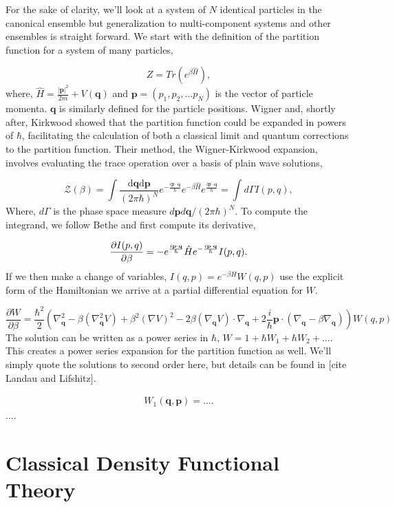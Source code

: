 For the sake of clarity, we'll look at a system of $N$ identical particles in the canonical ensemble but generalization to multi-component systems and other ensembles is straight forward. 
We start with the definition of the partition function for a system of many particles,  

\begin{equation}
    Z = Tr(e^{\beta \hat{H}}),
\end{equation} 
where, $\hat{H} = \frac{\vert\mathbf{p}\vert^2}{2m} + V(\mathbf{q})$ and $\mathbf{p} = (p_1, p_2, ...p_N)$ is the vector of particle momenta. 
$\mathbf{q}$ is similarly defined for the particle positions.
Wigner and, shortly after, Kirkwood showed that the partition function could be expanded in powers of $\hbar$, facilitating the calculation of both a classical limit and quantum corrections to the partition function.
Their method, the Wigner-Kirkwood expansion, involves evaluating the trace operation over a basis of plain wave solutions,

\begin{equation}
	\mathcal{Z}(\beta) = \int 
		\frac{\mathrm{d}\mathbf{q} \mathrm{d}\mathbf{p}}{(2\pi \hbar)^N}
		e^{-\frac{i\mathbf{p}\cdot\mathbf{q}}{\hbar}}
		e^{-\beta \hat{H}}
		e^{\frac{i\mathbf{p}\cdot\mathbf{q}}{\hbar}} = \int d\Gamma I(p, q),
\end{equation}
Where, $d\Gamma$ is the phase space measure $d\mathbf{p}d\mathbf{q}/(2\pi\hbar)^N$. To compute the integrand, we follow Bethe and first compute its derivative,

\begin{equation}
	\frac{\partial I(p, q)}{\partial \beta} = -e^{\frac{i\mathbf{p}\cdot\mathbf{q}}{\hbar}}\hat{H}e^{-\frac{i\mathbf{p}\cdot\mathbf{q}}{\hbar}} I(p, q).
\end{equation}
If we then make a change of variables, $I(q, p) = e^{-\beta H}W(q, p)$ use the explicit form of the Hamiltonian we arrive at a partial differential equation for $W$.

\begin{equation}
	\frac{\partial W}{\partial \beta} = \frac{\hbar^2}{2} \left(
		\nabla_{\mathbf{q}}^2 - 
		\beta(\nabla_{\mathbf{q}}^2V) + 
		\beta^2(\nabla V)^2 -
		2\beta(\nabla_{\mathbf{q}} V)\cdot\nabla_{\mathbf{q}} + 
		2 \frac{i}{\hbar}\mathbf{p}\cdot(\nabla_{\mathbf{q}} - \beta\nabla_{\mathbf{q}})
	\right)W(q, p)
\end{equation}
The solution can be written as a power series in $\hbar$, $W = 1 + \hbar W_1 + \hbar W_2 + ...$. This creates a power series expansion for the partition function as well. We'll simply quote the solutions to second order here, but details can be found in [cite Landau and Lifshitz].

\begin{gather}
	W_1(\mathbf{q}, \mathbf{p}) = .... 
\end{gather}
....

\section{Classical Density Functional Theory}

